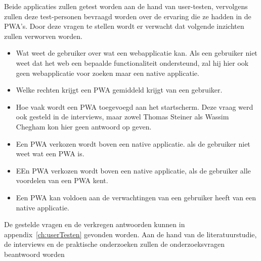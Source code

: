 Beide applicaties zullen getest worden aan de hand van user-testen, vervolgens zullen deze test-personen bevraagd worden over de ervaring die ze hadden in de PWA's.
Door deze vragen te stellen wordt er verwacht dat volgende inzichten zullen verworven worden.
\begin{itemize}
	\item Wat weet de gebruiker over wat een webapplicatie kan. Als een gebruiker niet weet dat het web een bepaalde functionaliteit ondersteund, zal hij hier ook geen webapplicatie voor zoeken maar een native applicatie.
	\item Welke rechten krijgt een PWA gemiddeld krijgt van een gebruiker.
	\item Hoe vaak wordt een PWA toegevoegd aan het startscherm. Deze vraag werd ook gesteld in de interviews, maar zowel Thomas Steiner als Wassim Chegham kon hier geen antwoord op geven.
	\item Een PWA verkozen wordt boven een native applicatie. als de gebruiker niet weet wat een PWA is.
	\item EEn PWA verkozen wordt boven een native applicatie, als de gebruiker alle voordelen van een PWA kent.	
	\item Een PWA kan voldoen aan de verwachtingen van een gebruiker heeft van een native applicatie.
\end{itemize}

De gestelde vragen en de verkregen antwoorden kunnen in appendix~\ref{ch:userTesten} gevonden worden.
Aan de hand van de literatuurstudie, de interviews en de praktische onderzoeken zullen de onderzoeksvragen beantwoord worden


